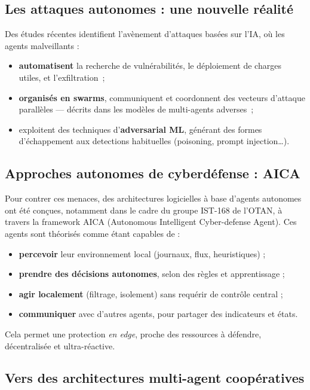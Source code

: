\documentclass[ twoside,openright,titlepage,numbers=noenddot,headinclude,%
                footinclude=true,cleardoublepage=empty,abstractoff, %
                BCOR=5mm,paper=a4,fontsize=11pt,%
                french,american,%
                ]{scrreprt}
\begin{document}
\subsection*{Les attaques autonomes : une nouvelle réalité}

Des études récentes identifient l'avènement d'attaques basées sur l'IA, où les agents malveillants :
\begin{itemize}
    \item \textbf{automatisent} la recherche de vulnérabilités, le déploiement de charges utiles, et l'exfiltration~\cite{AutoAttacker2024};
    \item \textbf{organisés en swarms}, communiquent et coordonnent des vecteurs d'attaque parallèles — décrits dans les modèles de multi-agents adverses~\cite{Falong2025};
    \item exploitent des techniques d'\textbf{adversarial ML}, générant des formes d'échappement aux detections habituelles (poisoning, prompt injection…).
\end{itemize}

\subsection*{Approches autonomes de cyberdéfense : AICA}

Pour contrer ces menaces, des architectures logicielles à base d'agents autonomes ont été conçues, notamment dans le cadre du groupe IST-168 de l'OTAN, à travers la framework AICA (Autonomous Intelligent Cyber-defense Agent). Ces agents sont théorisés comme étant capables de :
\begin{itemize}
    \item \textbf{percevoir} leur environnement local (journaux, flux, heuristiques) ;
    \item \textbf{prendre des décisions autonomes}, selon des règles et apprentissage ;
    \item \textbf{agir localement} (filtrage, isolement) sans requérir de contrôle central ;
    \item \textbf{communiquer} avec d'autres agents, pour partager des indicateurs et états.
\end{itemize}
Cela permet une protection {\em en edge}, proche des ressources à défendre, décentralisée et ultra-réactive.

\subsection*{Vers des architectures multi-agent coopératives}
\end{document}
